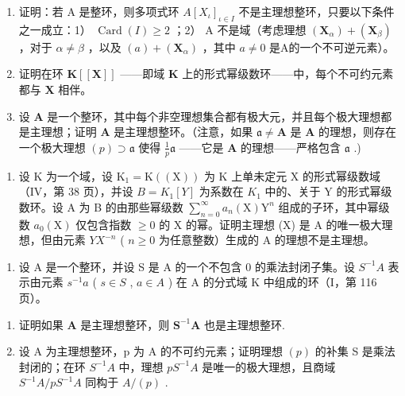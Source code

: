 \BourbakiExerciseGroup

\begin{enumerate}
\def\labelenumi{\arabic{enumi})}
\item
  证明：若 A 是整环，则多项式环 \(A[X_{\iota}]_{\iota \in I}\) 不是主理想整环，只要以下条件之一成立：1） \(\operatorname{Card}(I) \geqslant 2\) ；2） A 不是域（考虑理想 \((\mathbf{X}_{\alpha}) + (\mathbf{X}_{\beta})\) ，对于 \(\alpha \neq \beta\) ，以及 \((a) + (\mathbf{X}_{\alpha})\) ，其中 \(a \neq 0\) 是A的一个不可逆元素）。
\item
  证明在环 \(\mathbf{K}[[\mathbf{X}]]\) ——即域 \(\mathbf{K}\) 上的形式幂级数环——中，每个不可约元素都与 \(\mathbf{X}\) 相伴。
\item
  设 \(\mathbf{A}\) 是一个整环，其中每个非空理想集合都有极大元，并且每个极大理想都是主理想；证明 \(\mathbf{A}\) 是主理想整环。（注意，如果 \(\mathfrak{a} \neq \mathbf{A}\) 是 \(\mathbf{A}\) 的理想，则存在一个极大理想 \((p) \supset \mathfrak{a}\) 使得 \(\frac{1}{p} \mathfrak{a}\) ——它是 \(\mathbf{A}\) 的理想——严格包含 \(\mathfrak{a}\) .)
\end{enumerate}

\begin{enumerate}
\def\labelenumi{\alph{enumi})}
\setcounter{enumi}{1}
\tightlist
\item
  设 K 为一个域，设 \(\mathrm{K}_{1}=\mathrm{K}((\mathrm{X}))\) 为 K 上单未定元 X 的形式幂级数域（IV，第 38 页），并设 \(B=K_{1}[Y]\) 为系数在 \(K_{1}\) 中的、关于 Y 的形式幂级数环。设 A 为 B 的由那些幂级数 \(\sum_{n=0}^{\infty}a_{n}(\mathrm{X})\mathrm{Y}^{n}\) 组成的子环，其中幂级数 \(a_{0}(\mathrm{X})\) 仅包含指数 \(\geqslant 0\) 的 X 的幂。证明主理想 (X) 是 A 的唯一极大理想，但由元素 \(YX^{-n}\) ( \(n \geqslant 0\) 为任意整数）生成的 A 的理想不是主理想。
\end{enumerate}

\begin{enumerate}
\def\labelenumi{\arabic{enumi})}
\setcounter{enumi}{3}
\tightlist
\item
  设 A 是一个整环，并设 S 是 A 的一个不包含 0 的乘法封闭子集。设 \(S^{-1}A\) 表示由元素 \(s^{-1}a\) ( \(s \in S\) , \(a \in A\) ) 在 A 的分式域 K 中组成的环（I，第 116 页）。
\end{enumerate}

\begin{enumerate}
\def\labelenumi{\alph{enumi})}
\item
  证明如果 \(\mathbf{A}\) 是主理想整环，则 \(\mathbf{S}^{-1}\mathbf{A}\) 也是主理想整环.
\item
  设 A 为主理想整环，p 为 A 的不可约元素；证明理想 \((p)\) 的补集 S 是乘法封闭的；在环 \(S^{-1}A\) 中，理想 \(pS^{-1}A\) 是唯一的极大理想，且商域 \(S^{-1}A/pS^{-1}A\) 同构于 \(A/(p)\) .
\end{enumerate}


